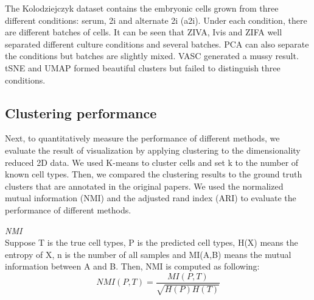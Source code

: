 The Kolodziejczyk dataset contains the embryonic cells grown from three different conditions: serum, 2i and alternate 2i (a2i). Under each condition, there are different batches of cells. It can be seen that ZIVA, Ivis and ZIFA well separated different culture conditions and several batches. PCA can also separate the conditions but batches are slightly mixed. VASC generated a mussy result. tSNE and UMAP formed beautiful clusters but failed to distinguish three conditions.
\subsection{Clustering performance}
Next, to quantitatively measure the performance of different methods, we evaluate the result of visualization by applying clustering to the dimensionality reduced 2D data. We used K-means to cluster cells and set k to the number of known cell types. Then, we compared the clustering results to the ground truth clusters that are annotated in the original papers. We used the normalized mutual information (NMI) \cite{strehl2002cluster} and the adjusted rand index (ARI) \cite{hubert1985comparing} to evaluate the performance of different methods. 

\vspace{0.5cm}
\noindent\emph{NMI} \\
Suppose T is the true cell types, P is the predicted cell types, H(X) means the entropy of X, n is the number of all samples and MI(A,B) means the mutual information between A and B. Then, NMI is computed as following:
\begin{equation}
    NMI(P, T)=\frac{MI(P, T)}{\sqrt{H(P) H(T)}}
\end{equation}

